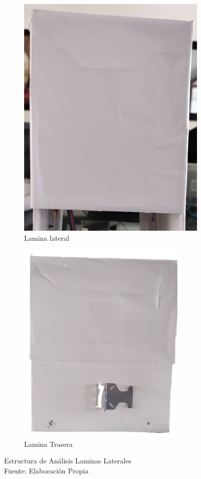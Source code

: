 \begin{figure}[h!]
	\centering
	\begin{subfigure}{0.47\linewidth}
		\centering
		\includegraphics[scale=0.3]{Figs/302.png}
		\caption{Lamina lateral}
		\label{fig:lateral}
	\end{subfigure}
	\begin{subfigure}{0.47\linewidth}
		\centering
		\includegraphics[scale=0.3]{Figs/303.png}
		\caption{Lamina Trasera}
		\label{fig:trasera}
	\end{subfigure}
	\caption{Estructura de Análisis Laminas Laterales\\
	Fuente: Elaboración Propia}
	\label{fig:estructuras}
\end{figure}   
 
